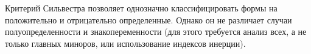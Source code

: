 \begin{remark}
Критерий Сильвестра позволяет однозначно классифицировать формы на положительно и отрицательно определенные. Однако он не различает случаи полуопределенности и знакопеременности (для этого требуется анализ всех, а не только главных миноров, или использование индексов инерции).
\end{remark}
